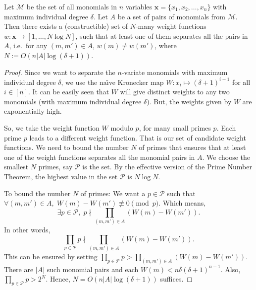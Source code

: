 \documentclass[final,oneeqnum, onethmnum, onefignum]{siamltex1213}
\def\naive{na\"{\i}ve }
\newcommand{\abs}[1]{\lvert #1 \rvert}
\newcommand{\M}{\mathcal M}
\newcommand{\degree}{\delta} %
\renewcommand{\o}[1]{\overline{#1}}
\begin{document}
\begin{lemma}%
\label{lem:kronecker}
Let $\M$ be the set of all monomials in $n$ variables
$\mathbf{x} = \{x_1, x_2, \dots, x_n\}$ with maximum individual
degree $\degree$. Let $A$ be a set of pairs of monomials from 
$\M$.  
Then there exists a (constructible) set of $N$-many weight functions
$w \colon \mathbf{x} \to [1, \dots, N \log N]$, such that at 
least one of them separates all the pairs in $A$, i.e.\
for any $(m,m') \in A$, $w(m) \neq w(m')$, 
where $N := O(n \abs{A} \log(\degree+1))$.

\end{lemma}
\begin{proof}
Since we want to separate the $n$-variate monomials with maximum 
individual degree $\degree$, 
we use the \naive Kronecker map $W \colon x_i \mapsto (\degree +1)^{i-1}$ 
for all $i \in [n]$. 
It can be easily seen that $W$ will give distinct weights to
any two monomials (with maximum individual degree $\degree$).
But, the weights given by $W$ are exponentially high. 

So, we take the weight function $W$ modulo $p$, for many small primes $p$. 
 Each prime $p$ leads to a different weight function. 
That is our set of candidate weight functions. 
We need to bound the number $N$ of primes 
that ensures that at least one of the weight functions 
separates all the monomial pairs in $A$. 
We choose the smallest $N$ primes, say $\mathcal{P}$ is the set. 
By the effective version of the Prime Number Theorem, 
the highest value in the set $\mathcal{P}$ is $N \log N$.

To bound the number $N$ of primes: We want a $p \in \mathcal{P}$ such that 
$\forall (m,m') \in A, \; W(m) - W(m') \not\equiv 0 \pmod{p}$.
 Which means, 
$$ \exists p \in \mathcal{P}, \;	
p \nmid \prod_{(m,m') \in A} \left( W(m) - W(m') \right).$$ 
In other words,
$$\prod_{p \in \mathcal{P}} p \nmid \prod_{(m,m') \in A} \left(W(m) - W(m')\right).$$ 
This can be ensured by setting 
$\prod_{p \in \mathcal{P}} p > \prod_{(m,m') \in A} \left(W(m) - W(m')\right)$.
There are $\abs{A}$ such monomial pairs and 
each $W(m) < n \degree (\degree+1)^{n -1}$. 
Also, $\prod_{p \in \mathcal{P}} p > 2^N$. Hence, $N = O(n \abs{A} \log(\degree+1))$ suffices.
\end{proof}

\end{document}
